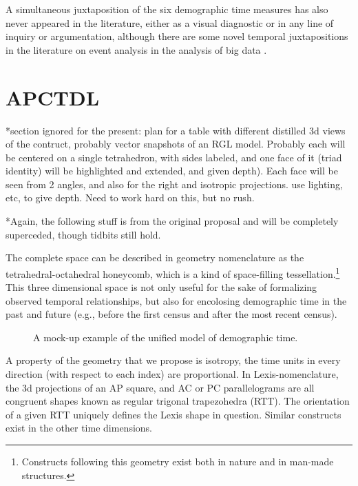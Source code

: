 \documentclass[12pt,oneside,letter]{article} %
\begin{document}
A simultaneous juxtaposition of the six demographic time measures has also never
appeared in the literature, either as a visual diagnostic or in any line of
inquiry or argumentation, although there are some novel temporal
juxtapositions in the literature on event analysis in the analysis of
big data \citep[see e.g.,]{watson2015timemaps}.

 \section*{APCTDL}
*section ignored for the present: plan for a table with different distilled 3d
views of the contruct, probably vector snapshots of an RGL model. Probably each
will be centered on a single tetrahedron, with sides labeled, and one face of
it (triad identity) will be highlighted and extended, and given depth). Each
face will be seen from 2 angles, and also for the right and isotropic
projections. use lighting, etc, to give depth. Need to work hard on this, but no
rush.

*Again, the following stuff is from the original proposal and will be completely
superceded, though tidbits still hold.

The complete space can be described in
geometry nomenclature as the tetrahedral-octahedral honeycomb, which is a kind of space-filling tessellation.\footnote{Constructs following
this geometry exist both in nature and in man-made structures.} 
 This three dimensional space is not only useful for the sake of formalizing observed temporal relationships, but also for encolosing
demographic time in the past and future (e.g., before the first census and after
the most recent census). 

\begin{figure}[!h]
\centering
\caption[cap]{A mock-up example of the unified model of demographic
time.\footnotemark}
\label{fig:APCT}
\end{figure}

A property of the geometry that we propose is isotropy,
the time units in every direction (with respect to each index) are proportional.
In Lexis-nomenclature, the 3d projections of an AP square, and AC or PC
parallelograms are all congruent shapes known as regular trigonal trapezohedra
(RTT). The orientation
of a given RTT uniquely defines the Lexis shape in question. Similar constructs
exist in the other time dimensions. 
\end{document}

